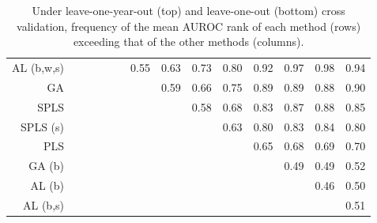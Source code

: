 \documentclass[authoryear,review, 12pt]{elsarticle}
\begin{document}
\begin{table}[h!]
{\begin{tabular}{rccccccccccccc}
  AL (b,w,s) &  &  &  &  &  & 0.55 & 0.63 & 0.73 & 0.80 & 0.92 & 0.97 & 0.98 & 0.94 \\ 
  GA &  &  &  &  &  &  & 0.59 & 0.66 & 0.75 & 0.89 & 0.89 & 0.88 & 0.90 \\ 
  SPLS &  &  &  &  &  &  &  & 0.58 & 0.68 & 0.83 & 0.87 & 0.88 & 0.85 \\ 
  SPLS (s) &  &  &  &  &  &  &  &  & 0.63 & 0.80 & 0.83 & 0.84 & 0.80 \\ 
  PLS &  &  &  &  &  &  &  &  &  & 0.65 & 0.68 & 0.69 & 0.70 \\ 
  GA (b) &  &  &  &  &  &  &  &  &  &  & 0.49 & 0.49 & 0.52 \\ 
  AL (b) &  &  &  &  &  &  &  &  &  &  &  & 0.46 & 0.50 \\ 
  AL (b,s) &  &  &  &  &  &  &  &  &  &  &  &  & 0.51 \\ 
  
    \end{tabular}}
    \caption{Under leave-one-year-out (top) and leave-one-out (bottom) cross validation, frequency of the mean AUROC rank of each method (rows) exceeding that of the other methods (columns).
    \label{tab:AUROC-comprehensive}}
\end{table}
\end{document}
